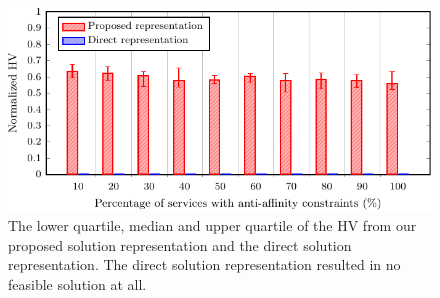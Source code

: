 \vspace{1em}
\noindent
{}

\begin{figure}[t!]
    \centering
    \includegraphics[width=\linewidth]{graphs/constraints/anti_affinity-crop}
    \caption{The lower quartile, median and upper quartile of the HV from our proposed solution representation and the direct solution representation. The direct solution representation resulted in no feasible solution at all.}
    \label{fig:anti_affinity}
\end{figure}
